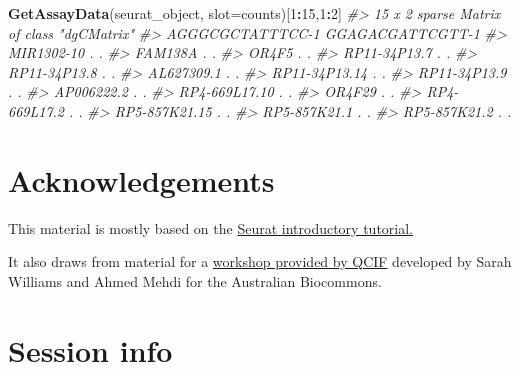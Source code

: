 \documentclass[
]{book}
\newenvironment{Shaded}{\begin{snugshade}}{\end{snugshade}}
\newcommand{\AttributeTok}[1]{\textcolor[rgb]{0.13,0.29,0.53}{#1}}
\newcommand{\CommentTok}[1]{\textcolor[rgb]{0.56,0.35,0.01}{\textit{#1}}}
\newcommand{\DecValTok}[1]{\textcolor[rgb]{0.00,0.00,0.81}{#1}}
\newcommand{\FunctionTok}[1]{\textcolor[rgb]{0.13,0.29,0.53}{\textbf{#1}}}
\newcommand{\NormalTok}[1]{#1}
\newcommand{\SpecialCharTok}[1]{\textcolor[rgb]{0.81,0.36,0.00}{\textbf{#1}}}
\newcommand{\StringTok}[1]{\textcolor[rgb]{0.31,0.60,0.02}{#1}}
\begin{document}
\begin{Shaded}
\begin{Highlighting}[]
\FunctionTok{GetAssayData}\NormalTok{(seurat\_object, }\AttributeTok{slot=}\StringTok{\textquotesingle{}counts\textquotesingle{}}\NormalTok{)[}\DecValTok{1}\SpecialCharTok{:}\DecValTok{15}\NormalTok{,}\DecValTok{1}\SpecialCharTok{:}\DecValTok{2}\NormalTok{]}
\CommentTok{\#\textgreater{} 15 x 2 sparse Matrix of class "dgCMatrix"}
\CommentTok{\#\textgreater{}               AGGGCGCTATTTCC{-}1 GGAGACGATTCGTT{-}1}
\CommentTok{\#\textgreater{} MIR1302{-}10                   .                .}
\CommentTok{\#\textgreater{} FAM138A                      .                .}
\CommentTok{\#\textgreater{} OR4F5                        .                .}
\CommentTok{\#\textgreater{} RP11{-}34P13.7                 .                .}
\CommentTok{\#\textgreater{} RP11{-}34P13.8                 .                .}
\CommentTok{\#\textgreater{} AL627309.1                   .                .}
\CommentTok{\#\textgreater{} RP11{-}34P13.14                .                .}
\CommentTok{\#\textgreater{} RP11{-}34P13.9                 .                .}
\CommentTok{\#\textgreater{} AP006222.2                   .                .}
\CommentTok{\#\textgreater{} RP4{-}669L17.10                .                .}
\CommentTok{\#\textgreater{} OR4F29                       .                .}
\CommentTok{\#\textgreater{} RP4{-}669L17.2                 .                .}
\CommentTok{\#\textgreater{} RP5{-}857K21.15                .                .}
\CommentTok{\#\textgreater{} RP5{-}857K21.1                 .                .}
\CommentTok{\#\textgreater{} RP5{-}857K21.2                 .                .}
\end{Highlighting}
\end{Shaded}

\hypertarget{acknowledgements}{%
\chapter{Acknowledgements}\label{acknowledgements}}

This material is mostly based on the \href{https://satijalab.org/seurat/articles/pbmc3k_tutorial.html}{Seurat introductory tutorial.}

It also draws from material for a \href{https://swbioinf.github.io/scRNAseqInR_Doco/index.html}{workshop provided by QCIF} developed by Sarah Williams and Ahmed Mehdi for the Australian Biocommons.

\hypertarget{session-info}{%
\chapter{Session info}\label{session-info}}
\end{document}
